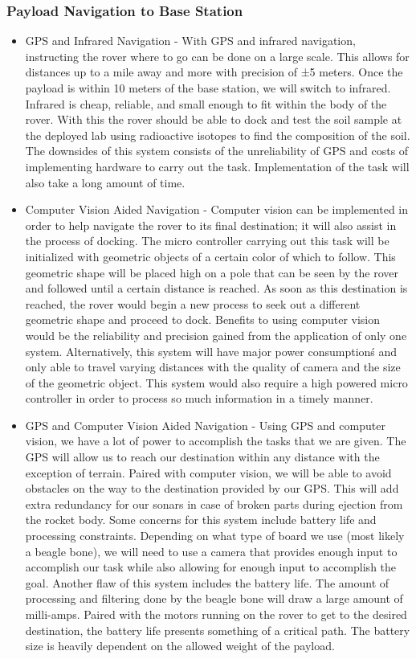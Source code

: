 \documentclass[onecolumn, draftclsnofoot, 10pt, compsoc]{IEEEtran}
\begin{document}
\subsubsection{Payload Navigation to Base Station}
\begin{itemize}
	\item  GPS and Infrared Navigation - With GPS and infrared navigation, instructing the rover where to go can be done on a large scale. This allows for distances up to a mile away and more with precision of ±5 meters. Once the payload is within 10 meters of the base station, we will switch to infrared. Infrared is cheap, reliable, and small enough to fit within the body of the rover. With this the rover should be able to dock and test the soil sample at the deployed lab using radioactive isotopes to find the composition of the soil. The downsides of this system consists of the unreliability of GPS and costs of implementing hardware to carry out the task. Implementation of the task will also take a long amount of time. 
	\item Computer Vision Aided Navigation - Computer vision can be implemented in order to help navigate the rover to its final destination; it will also assist in the process of docking. The micro controller carrying out this task will be initialized with geometric objects of a certain color of which to follow. This geometric shape will be placed high on a pole that can be seen by the rover and followed until a certain distance is reached. As soon as this destination is reached, the rover would begin a new process to seek out a different geometric shape and proceed to dock. Benefits to using computer vision would be the reliability and precision gained from the application of only one system. Alternatively, this system will have major power consumption\'s and only able to travel varying distances with the quality of camera and the size of the geometric object. This system would also require a high powered micro controller in order to process so much information in a timely manner. 
	\item GPS and Computer Vision Aided Navigation - Using GPS and computer vision, we have a lot of power to accomplish the tasks that we are given. The GPS will allow us to reach our destination within any distance with the exception of terrain. Paired with computer vision, we will be able to avoid obstacles on the way to the destination provided by our GPS. This will add extra redundancy for our sonars in case of broken parts during ejection from the rocket body. Some concerns for this system include battery life and processing constraints. Depending on what type of board we use (most likely a beagle bone), we will need to use a camera that provides enough input to accomplish our task while also allowing for enough input to accomplish the goal. Another flaw of this system includes the battery life. The amount of processing and filtering done by the beagle bone will draw a large amount of milli-amps. Paired with the motors running on the rover to get to the desired destination, the battery life presents something of a critical path. The battery size is heavily dependent on the allowed weight of the payload. 
\end{itemize}
\end{document}
